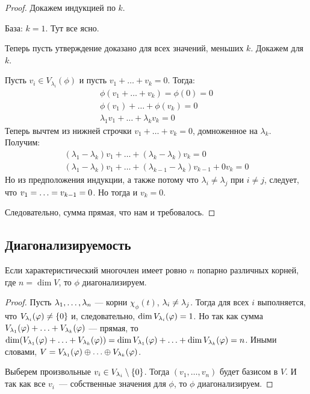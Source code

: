 \begin{proof}
Докажем индукцией по $k$.

База: $k = 1$. Тут все ясно.

Теперь пусть утверждение доказано для всех значений, меньших $k$. Докажем для $k$.

Пусть $v_i \in V_{\lambda_i}(\phi)$ и пусть $v_1 + \ldots + v_k = 0$. Тогда:
\begin{gather*}
\phi(v_1 + \ldots + v_k) = \phi(0) = 0 \\
\phi(v_1) + \ldots + \phi(v_k) = 0 \\
\lambda_1v_1 + \ldots + \lambda_kv_k = 0
\end{gather*}
Теперь вычтем из нижней строчки $v_1 + \ldots + v_k = 0$, домноженное на $\lambda_k$. Получим:
\begin{gather*}
(\lambda_1 - \lambda_k)v_1 + \ldots + (\lambda_k -\lambda_k)v_k = 0 \\
(\lambda_1 - \lambda_k)v_1 + \ldots + (\lambda_{k-1} -\lambda_k)v_{k-1} + 0v_k= 0
\end{gather*}
Но из предположения индукции, а также потому что $\lambda_i \neq \lambda_j$ при $i \neq j$, следует, что $v_1 = \ldots \hm= v_{k-1} = 0$. Но тогда и $v_k = 0$. 

Следовательно, сумма прямая, что нам и требовалось.
\end{proof}

\subsection*{Диагонализируемость}

\begin{Consequence}
Если характеристический многочлен имеет ровно $n$ попарно различных корней, где $n = \dim V$, то $\phi$ диагонализируем.
\end{Consequence}

\begin{proof}
Пусть $\lambda_1, \ldots, \lambda_n$ --- корни $\chi_\phi(t)$, $\lambda_i \neq \lambda_j$. Тогда для всех $i$ выполняется, что $V_{\lambda_i}(\varphi) \neq \{0\}$ и, следовательно, $\dim V_{\lambda_i}(\varphi) = 1$. Но так как сумма $V_{\lambda_1}(\varphi) + \ldots + V_{\lambda_k}(\varphi)$ --- прямая, то $\dim (V_{\lambda_1}(\varphi) + \ldots + V_{\lambda_k}(\varphi)) = \dim V_{\lambda_1}(\varphi) + \ldots + \dim V_{\lambda_k}(\varphi) = n$. Иными словами, $V = V_{\lambda_1}(\varphi) \oplus \ldots \oplus V_{\lambda_k}(\varphi)$.

Выберем произвольные $v_i \in V_{\lambda_i}\setminus\{0\}$. Тогда $(v_1, \ldots, v_n)$ будет базисом в $V$. И так как все $v_i$~--- собственные значения для $\phi$, то $\phi$ диагонализируем.
\end{proof}

